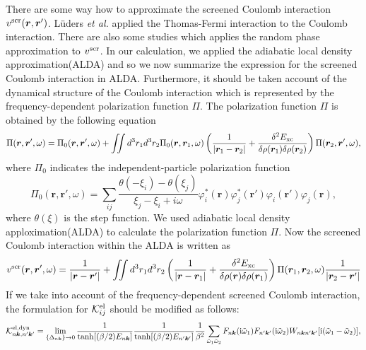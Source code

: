 There are some way how to approximate the screened Coulomb interaction $v^{\rm scr}(\bm r, \bm r')$. 
L\"{u}ders {\it et al.} applied the Thomas-Fermi interaction to the Coulomb interaction\cite{Luders2005_1}.
There are also some studies which applies the random phase approximation to $v^{\rm scr}$\cite{RA2012}.
In our calculation, we applied the adiabatic local density approximation(ALDA)\cite{Zangwill1980} and 
so we now summarize the expression for the screened Coulomb interaction in ALDA.
Furthermore, it should be taken account of the dynamical structure of the Coulomb interaction which is represented by
the frequency-dependent polarization function $\Pi$.
The polarization function $\Pi$ is obtained by the following equation
%
\begin{equation}
	\Pi(\bm r, \bm r', \omega) = \Pi_0(\bm r, \bm r', \omega) + 
	\iint d^3r_1d^3r_2\Pi_0(\bm r, \bm r_1, \omega) 
	\left(
	\frac{1}{|\bm r_1 - \bm r_2|} + \frac{\delta^2E_{\rm xc}}{\delta\rho(\bm r_1)\delta\rho(\bm r_2)}
	\right)
	\Pi(\bm r_2, \bm r', \omega), 
	\label{eq:Pieq}
\end{equation}
%
where $\Pi_0$ indicates the independent-particle polarization function
%
\begin{equation}
	\Pi_0(\bm r, \bm r', \omega) = \sum_{ij}
	\frac{\theta(-\xi_i)-\theta(\xi_j)}{\xi_j-\xi_i+i\omega}
	\varphi^\ast_i(\bm r)\varphi^\ast_j(\bm r')\varphi_i(\bm r')\varphi_j(\bm r),
	\label{eq:chi0}
\end{equation}
%
where $\theta(\xi)$ is the step function. We used adiabatic local density apploximation(ALDA)\cite{TDDFT} to calculate
the polarization function $\Pi$. Now the screened Coulomb interaction within the ALDA is written as
%
\begin{equation}
	v^{\rm scr}(\bm r, \bm r', \omega) = \frac{1}{|\bm r - \bm r'|} + 
	\iint d^3r_1 d^3r_2 
	\left(
	\frac{1}{|\bm r - \bm r_1|} + \frac{\delta^2E_{\rm xc}}{\delta\rho(\bm r)\delta\rho(\bm r_1)}
	\right)
	\Pi(\bm r_1, \bm r_2, \omega) \frac{1}{|\bm r_2 - \bm r'|}
	\label{eq:vscr}
\end{equation}
%
If we take into account of the frequency-dependent screened Coulomb interaction,
the formulation for ${\mathcal K}^{\rm el}_{ij}$ should be modified as follows\cite{ra2013}:
%
\begin{equation}
	{\mathcal K}^{\rm el, dyn}_{n\bm k,n'\bm k'} = 
	\lim_{\{\Delta_{n\bm k}\} \to 0}
	\frac{1}{\tanh[(\beta/2)E_{n\bm k}]}\frac{1}{\tanh[(\beta/2)E_{n'\bm k'}]}
	\frac{1}{\beta^2}
	\sum_{\tilde{\omega}_1\tilde{\omega}_2}
	F_{n\bm k}({\rm i}\tilde\omega_1)F_{n'\bm k'}({\rm i}\tilde\omega_2)
	W_{n\bm kn'\bm k'}[{\rm i}(\tilde\omega_1 - \tilde\omega_2)],
	\label{eq:Keldyn}
\end{equation}
